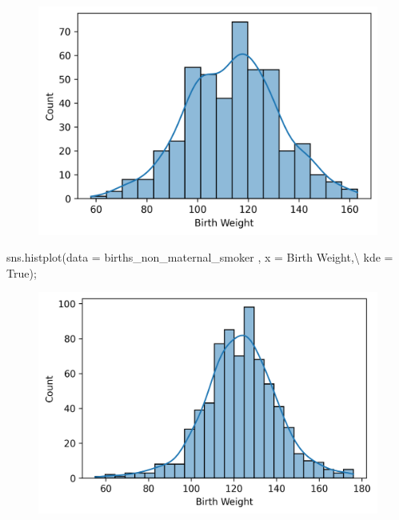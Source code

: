 \documentclass[
  letterpaper,
  DIV=11,
  numbers=noendperiod]{scrreprt}
\newenvironment{Shaded}{\begin{snugshade}}{\end{snugshade}}
\newcommand{\NormalTok}[1]{\textcolor[rgb]{0.00,0.23,0.31}{#1}}
\newcommand{\OperatorTok}[1]{\textcolor[rgb]{0.37,0.37,0.37}{#1}}
\newcommand{\StringTok}[1]{\textcolor[rgb]{0.13,0.47,0.30}{#1}}
\newcommand{\VariableTok}[1]{\textcolor[rgb]{0.07,0.07,0.07}{#1}}
\begin{document}
\begin{figure}[H]

{\centering \includegraphics{visualization_1/visualization_1_files/figure-pdf/cell-16-output-1.png}

}

\end{figure}

\begin{Shaded}
\begin{Highlighting}[]
\NormalTok{sns.histplot(data }\OperatorTok{=}\NormalTok{ births\_non\_maternal\_smoker , x }\OperatorTok{=} \StringTok{\textquotesingle{}Birth Weight\textquotesingle{}}\NormalTok{,}\OperatorTok{\textbackslash{}}
\NormalTok{             kde }\OperatorTok{=} \VariableTok{True}\NormalTok{)}\OperatorTok{;}
\end{Highlighting}
\end{Shaded}

\begin{figure}[H]

{\centering \includegraphics{visualization_1/visualization_1_files/figure-pdf/cell-17-output-1.png}

}

\end{figure}
\end{document}
